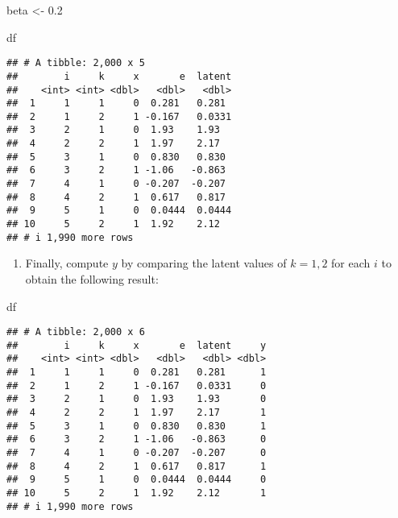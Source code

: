 \documentclass[
]{book}
\newenvironment{Shaded}{\begin{snugshade}}{\end{snugshade}}
\newcommand{\FloatTok}[1]{\textcolor[rgb]{0.00,0.00,0.81}{#1}}
\newcommand{\NormalTok}[1]{#1}
\newcommand{\OtherTok}[1]{\textcolor[rgb]{0.56,0.35,0.01}{#1}}
\providecommand{\tightlist}{%
  \setlength{\itemsep}{0pt}\setlength{\parskip}{0pt}}
\begin{document}
\begin{Shaded}
\begin{Highlighting}[]
\NormalTok{beta }\OtherTok{\textless{}{-}} \FloatTok{0.2}
\end{Highlighting}
\end{Shaded}

\begin{Shaded}
\begin{Highlighting}[]
\NormalTok{df}
\end{Highlighting}
\end{Shaded}

\begin{verbatim}
## # A tibble: 2,000 x 5
##        i     k     x       e  latent
##    <int> <int> <dbl>   <dbl>   <dbl>
##  1     1     1     0  0.281   0.281 
##  2     1     2     1 -0.167   0.0331
##  3     2     1     0  1.93    1.93  
##  4     2     2     1  1.97    2.17  
##  5     3     1     0  0.830   0.830 
##  6     3     2     1 -1.06   -0.863 
##  7     4     1     0 -0.207  -0.207 
##  8     4     2     1  0.617   0.817 
##  9     5     1     0  0.0444  0.0444
## 10     5     2     1  1.92    2.12  
## # i 1,990 more rows
\end{verbatim}

\begin{enumerate}
\def\labelenumi{\arabic{enumi}.}
\setcounter{enumi}{3}
\tightlist
\item
  Finally, compute \(y\) by comparing the latent values of \(k = 1, 2\) for each \(i\) to obtain the following result:
\end{enumerate}

\begin{Shaded}
\begin{Highlighting}[]
\NormalTok{df}
\end{Highlighting}
\end{Shaded}

\begin{verbatim}
## # A tibble: 2,000 x 6
##        i     k     x       e  latent     y
##    <int> <int> <dbl>   <dbl>   <dbl> <dbl>
##  1     1     1     0  0.281   0.281      1
##  2     1     2     1 -0.167   0.0331     0
##  3     2     1     0  1.93    1.93       0
##  4     2     2     1  1.97    2.17       1
##  5     3     1     0  0.830   0.830      1
##  6     3     2     1 -1.06   -0.863      0
##  7     4     1     0 -0.207  -0.207      0
##  8     4     2     1  0.617   0.817      1
##  9     5     1     0  0.0444  0.0444     0
## 10     5     2     1  1.92    2.12       1
## # i 1,990 more rows
\end{verbatim}
\end{document}
